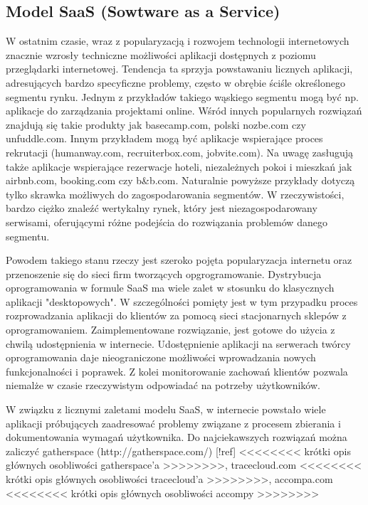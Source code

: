     \subsection{Model SaaS (Sowtware as a Service)}


      W ostatnim czasie, wraz z popularyzacją i rozwojem technologii internetowych znacznie wzrosły techniczne możliwości aplikacji dostępnych z poziomu przeglądarki internetowej. Tendencja ta sprzyja powstawaniu licznych aplikacji, adresujących bardzo specyficzne problemy, często w obrębie ściśle określonego segmentu rynku. Jednym z przykładów takiego wąskiego segmentu mogą być np. aplikacje do zarządzania projektami online. Wśród innych popularnych rozwiązań znajdują się takie produkty jak basecamp.com, polski nozbe.com czy unfuddle.com. Innym przykładem mogą być aplikacje wspierające proces rekrutacji (humanway.com, recruiterbox.com, jobvite.com). Na uwagę zasługują także aplikacje wspierające rezerwacje hoteli, niezależnych pokoi i mieszkań jak airbnb.com, booking.com czy b\&b.com. Naturalnie powyższe przykłady dotyczą tylko skrawka możliwych do zagospodarowania segmentów. W rzeczywistości, bardzo ciężko znaleźć wertykalny rynek, który jest niezagospodarowany serwisami, oferującymi różne podejścia do rozwiązania problemów danego segmentu. 

      Powodem takiego stanu rzeczy jest szeroko pojęta popularyzacja internetu oraz przenoszenie się do sieci firm tworzących opgrogramowanie. Dystrybucja oprogramowania w formule SaaS ma wiele zalet w stosunku do klasycznych aplikacji "desktopowych". W szczególności pomięty jest w tym przypadku proces rozprowadzania aplikacji do klientów za pomocą sieci stacjonarnych sklepów z oprogramowaniem. Zaimplementowane rozwiązanie, jest gotowe do użycia z chwilą udostępnienia w internecie. Udostępnienie aplikacji na serwerach twórcy oprogramowania daje nieograniczone możliwości wprowadzania nowych funkcjonalności i poprawek. Z kolei monitorowanie zachowań klientów pozwala niemalże w czasie rzeczywistym odpowiadać na potrzeby użytkowników. 

      W związku z licznymi zaletami modelu SaaS, w internecie powstało wiele aplikacji próbujących zaadresować problemy związane z procesem zbierania i dokumentowania wymagań użytkownika. Do najciekawszych rozwiązań można zaliczyć gatherspace (http://gatherspace.com/) [!ref] <<<<<<<< krótki opis głównych osobliwości gatherspace'a >>>>>>>>, tracecloud.com <<<<<<<< krótki opis głównych osobliwości tracecloud'a >>>>>>>>, accompa.com <<<<<<<< krótki opis głównych osobliwości accompy >>>>>>>> 


